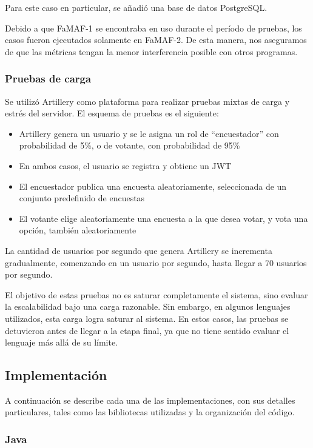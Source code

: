 \documentclass[11pt]{article}
\let\Oldsubsection\subsection
\renewcommand{\subsection}{\FloatBarrier\Oldsubsection}
\let\Oldsubsubsection\subsubsection
\renewcommand{\subsubsection}{\FloatBarrier\Oldsubsubsection}
\begin{document}
Para este caso en particular, se añadió una base de datos PostgreSQL.

Debido a que FaMAF-1 se encontraba en uso durante el período de pruebas, los casos fueron ejecutados solamente en FaMAF-2. De esta manera, nos aseguramos de que las métricas tengan la menor interferencia posible con otros programas.

\subsubsection{Pruebas de carga}

Se utilizó Artillery \cite{http:artillery} como plataforma para realizar pruebas mixtas de carga y estrés del servidor. El esquema de pruebas es el siguiente:

\begin{itemize}
    \item Artillery genera un usuario y se le asigna un rol de “encuestador” con probabilidad de 5\%, o de votante, con probabilidad de 95\%
    \item En ambos casos, el usuario se registra y obtiene un JWT
    \item El encuestador publica una encuesta aleatoriamente, seleccionada de un conjunto predefinido de encuestas
    \item El votante elige aleatoriamente una encuesta a la que desea votar, y vota una opción, también aleatoriamente
\end{itemize}

La cantidad de usuarios por segundo que genera Artillery se incrementa gradualmente, comenzando en un usuario por segundo, hasta llegar a 70 usuarios por segundo.

El objetivo de estas pruebas no es saturar completamente el sistema, sino evaluar la escalabilidad bajo una carga razonable. Sin embargo, en algunos lenguajes utilizados, esta carga logra saturar al sistema. En estos casos, las pruebas se detuvieron antes de llegar a la etapa final, ya que no tiene sentido evaluar el lenguaje más allá de su límite.

\subsection{Implementación}

A continuación se describe cada una de las implementaciones, con sus detalles particulares, tales como las bibliotecas utilizadas y la organización del código.

\subsubsection{Java}
\end{document}

